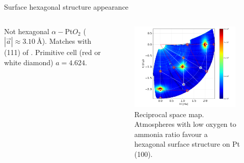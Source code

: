 \begin{frame}{Surface hexagonal structure appearance}
\begin{columns}
    Not hexagonal $\alpha-$Pt$O_2$ ($|\Vec{a}| \approx \SI{3.10}{\angstrom}$). Matches with (111) of \ptthreeofour. Primitive cell (red or white diamond) $a=4.624$.
    
    
    \begin{figure}
        \centering

        \includegraphics[trim=40 0 40 0, clip, width=0.95\textwidth]{Figures/sxrd_data/maps/Map_hkl_surf_or_2227-2283.png}
        \caption{Reciprocal space map. Atmospheres with low oxygen to ammonia ratio favour a hexagonal surface structure on Pt (100).}
        \label{fig:CondB}
    \end{figure}
    
    \end{columns}

\end{frame}